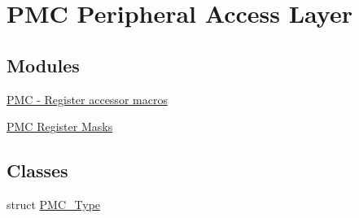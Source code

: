 \hypertarget{group__PMC__Peripheral__Access__Layer}{}\section{P\+MC Peripheral Access Layer}
\label{group__PMC__Peripheral__Access__Layer}
\subsection*{Modules}
\begin{DoxyCompactItemize}
\item 
\hyperlink{group__PMC__Register__Accessor__Macros}{P\+M\+C -\/ Register accessor macros}
\item 
\hyperlink{group__PMC__Register__Masks}{P\+M\+C Register Masks}
\end{DoxyCompactItemize}
\subsection*{Classes}
\begin{DoxyCompactItemize}
\item 
struct \hyperlink{structPMC__Type}{P\+M\+C\+\_\+\+Type}
\end{DoxyCompactItemize}
